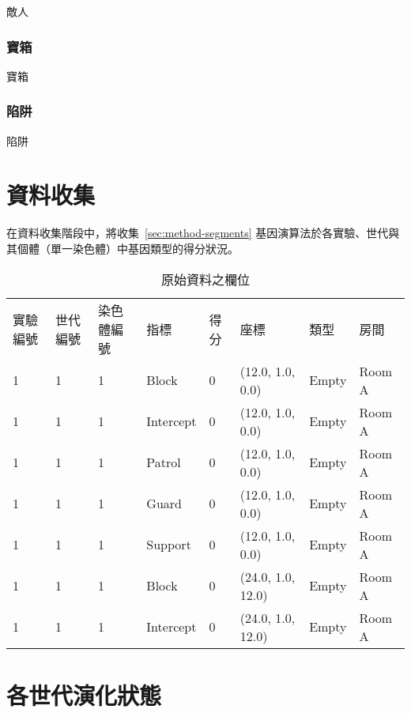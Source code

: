 敵人

\subsubsection{寶箱}
\label{sssec:experiment-gameobjects-treasure}

寶箱

\subsubsection{陷阱}
\label{sssec:experiment-gameobjects-trap}

陷阱

\section{資料收集}
\label{sec:experiment-datacollection}

在資料收集階段中，將收集~\ref{sec:method-segments} 基因演算法於各實驗、世代與其個體（單一染色體）中基因類型的得分狀況。

\begin{table}[ht]
  \centering
  \caption{原始資料之欄位}
  \label{tbl:structure-of-rawdata}
  \bigskip
  \begin{tabular}{| l | l | l | l | l | l | l | l |}
    \hline
    實驗編號 & 世代編號 & 染色體編號 & 指標 & 得分 & 座標 & 類型 & 房間 \\
    1 & 1 & 1 & Block     & 0 & (12.0, 1.0, 0.0)  & Empty & Room A \\
    1 & 1 & 1 & Intercept & 0 & (12.0, 1.0, 0.0)  & Empty & Room A \\
    1 & 1 & 1 & Patrol    & 0 & (12.0, 1.0, 0.0)  & Empty & Room A \\
    1 & 1 & 1 & Guard     & 0 & (12.0, 1.0, 0.0)  & Empty & Room A \\
    1 & 1 & 1 & Support   & 0 & (12.0, 1.0, 0.0)  & Empty & Room A \\
    1 & 1 & 1 & Block     & 0 & (24.0, 1.0, 12.0) & Empty & Room A \\
    1 & 1 & 1 & Intercept & 0 & (24.0, 1.0, 12.0) & Empty & Room A \\
    \hline
  \end{tabular}
\end{table}

\section{各世代演化狀態}
\label{sec:experiment-evolutions}

